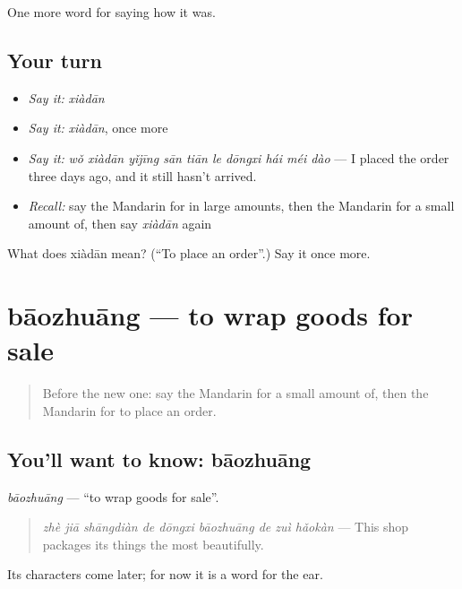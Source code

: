 \begin{grammarlens}[title={What you've built}]
One more word for saying how it was.
\end{grammarlens}

\subsection*{Your turn}
\begin{itemize}
\raggedright
  \item \emph{Say it:} \emph{xiàdān}
  \item \emph{Say it:} \emph{xiàdān}, once more
  \item \emph{Say it:} \emph{wǒ xiàdān yǐjīng sān tiān le dōngxi hái méi dào} — I placed the order three days ago, and it still hasn't arrived.
  \item \emph{Recall:} say the Mandarin for in large amounts, then the Mandarin for a small amount of, then say \emph{xiàdān} again
\end{itemize}

\begin{tcolorbox}[breakable,colback=teal!4,colframe=teal!35!black,title={Before you move on}]
What does xiàdān mean? (\textquotedblleft{}To place an order\textquotedblright{}.) Say it once more.
\end{tcolorbox}
\section[bāozhuāng]{bāozhuāng — to wrap goods for sale}

\label{lesson:ZH-C527-baozhuang}



\begin{quote}
Before the new one: say the Mandarin for a small amount of, then the Mandarin for to place an order.
\end{quote}

\subsection*{You'll want to know: bāozhuāng}
\emph{bāozhuāng} — \textquotedblleft{}to wrap goods for sale\textquotedblright{}.

\begin{quote}
\emph{zhè jiā shāngdiàn de dōngxi bāozhuāng de zuì hǎokàn} — This shop packages its things the most beautifully.
\end{quote}

Its characters come later; for now it is a word for the ear.

